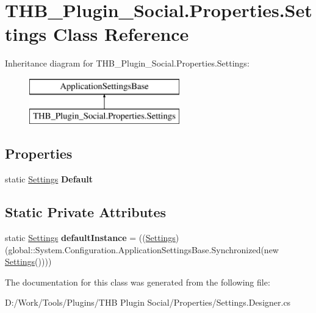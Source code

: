 \hypertarget{class_t_h_b___plugin___social_1_1_properties_1_1_settings}{}\section{T\+H\+B\+\_\+\+Plugin\+\_\+\+Social.\+Properties.\+Settings Class Reference}
\label{class_t_h_b___plugin___social_1_1_properties_1_1_settings}
Inheritance diagram for T\+H\+B\+\_\+\+Plugin\+\_\+\+Social.\+Properties.\+Settings\+:\begin{figure}[H]
\begin{center}
\leavevmode
\includegraphics[height=2.000000cm]{d5/dbf/class_t_h_b___plugin___social_1_1_properties_1_1_settings}
\end{center}
\end{figure}
\subsection*{Properties}
\begin{DoxyCompactItemize}
\item 
\mbox{\label{class_t_h_b___plugin___social_1_1_properties_1_1_settings_a561f116fda9ea9e2cee13c36295a5a8a}} 
static \mbox{\hyperlink{class_t_h_b___plugin___social_1_1_properties_1_1_settings}{Settings}} {\bfseries Default}
\end{DoxyCompactItemize}
\subsection*{Static Private Attributes}
\begin{DoxyCompactItemize}
\item 
\mbox{\label{class_t_h_b___plugin___social_1_1_properties_1_1_settings_ad13b332c3b0bb32f646f60e018fb93cd}} 
static \mbox{\hyperlink{class_t_h_b___plugin___social_1_1_properties_1_1_settings}{Settings}} {\bfseries default\+Instance} = ((\mbox{\hyperlink{class_t_h_b___plugin___social_1_1_properties_1_1_settings}{Settings}})(global\+::\+System.\+Configuration.\+Application\+Settings\+Base.\+Synchronized(new \mbox{\hyperlink{class_t_h_b___plugin___social_1_1_properties_1_1_settings}{Settings}}())))
\end{DoxyCompactItemize}


The documentation for this class was generated from the following file\+:\begin{DoxyCompactItemize}
\item 
D\+:/\+Work/\+Tools/\+Plugins/\+T\+H\+B Plugin Social/\+Properties/Settings.\+Designer.\+cs\end{DoxyCompactItemize}
